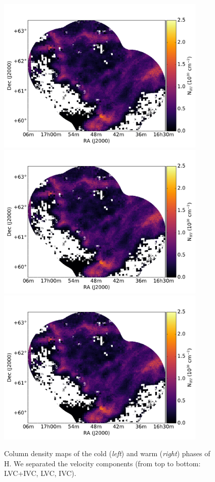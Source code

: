 \documentclass[traditabstract]{aa}
\begin{document}
\begin{figure}[h]
  \hspace{5mm}
  \includegraphics[page=5,height=7.5cm,trim=110 35 105 75,clip=true]{Figures/DHIGLS_NHI.pdf} \\
  \vspace{5mm}
  \includegraphics[page=3,height=7.5cm,trim=110 35 105 75,clip=true]{Figures/DHIGLS_NHI.pdf}
  \hspace{5mm}
  \includegraphics[page=6,height=7.5cm,trim=110 35 105 75,clip=true]{Figures/DHIGLS_NHI.pdf}
  \caption{\label{Phases_DHIGLS} Column density maps of the cold (\emph{left}) and warm (\emph{right}) phases of H. We separated the velocity components (from top to bottom: LVC+IVC, LVC, IVC).}
\end{figure}
\end{document}
